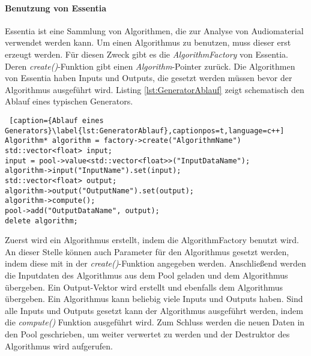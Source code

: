 \documentclass[11pt,a4paper]{article}
\begin{document}
\paragraph{Benutzung von Essentia}
Essentia ist eine Sammlung von Algorithmen, die zur Analyse von Audiomaterial verwendet werden kann. Um einen Algorithmus zu benutzen, muss dieser erst erzeugt werden. Für diesen Zweck gibt es die \textit{AlgorithmFactory} von Essentia. Deren \textit{create()}-Funktion gibt einen \textit{Algorithm}-Pointer zurück. Die Algorithmen von Essentia haben Inputs und Outputs, die gesetzt werden müssen bevor der Algorithmus ausgeführt wird. Listing \ref{lst:GeneratorAblauf} zeigt schematisch den Ablauf eines typischen Generators.
\begin{lstlisting} [caption={Ablauf eines Generators}\label{lst:GeneratorAblauf},captionpos=t,language=c++]
Algorithm* algorithm = factory->create("AlgorithmName")
std::vector<float> input;
input = pool->value<std::vector<float>>("InputDataName");
algorithm->input("InputName").set(input);
std::vector<float> output;
algorithm->output("OutputName").set(output);
algorithm->compute();
pool->add("OutputDataName", output);
delete algorithm;
\end{lstlisting}
\noindent
Zuerst wird ein Algorithmus erstellt, indem die AlgorithmFactory benutzt wird. An dieser Stelle können auch Parameter für den Algorithmus gesetzt werden, indem diese mit in der \textit{create()}-Funktion angegeben werden. Anschließend werden die Inputdaten des Algorithmus aus dem Pool geladen und dem Algorithmus übergeben. Ein Output-Vektor wird erstellt und ebenfalls dem Algorithmus übergeben. Ein Algorithmus kann beliebig viele Inputs und Outputs haben. Sind alle Inputs und Outputs gesetzt kann der Algorithmus ausgeführt werden, indem die \textit{compute()} Funktion ausgeführt wird. Zum Schluss werden die neuen Daten in den Pool geschrieben, um weiter verwertet zu werden und der Destruktor des Algorithmus wird aufgerufen.
\end{document}
